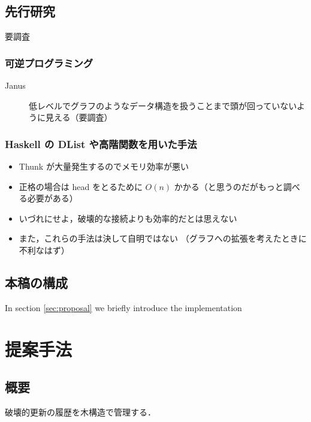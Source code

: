 \documentclass[10pt, a4j, twocolumn]{scrartcl}
\begin{document}
\subsection{先行研究}
\label{sec:org99d6785}

要調査

\subsubsection{可逆プログラミング}
\label{sec:orge2616bb}
\begin{description}
\item[{Janus}] 低レベルでグラフのようなデータ構造を扱うことまで頭が回っていないように見える（要調査）
\end{description}


\subsubsection{Haskell の DList や高階関数を用いた手法}
\label{sec:org884b901}
\begin{itemize}
\item Thunk が大量発生するのでメモリ効率が悪い
\item 正格の場合は head をとるために \(O(n)\) かかる（と思うのだがもっと調べる必要がある）
\item いづれにせよ，破壊的な接続よりも効率的だとは思えない
\item また，これらの手法は決して自明ではない
（グラフへの拡張を考えたときに不利なはず）
\end{itemize}


\subsection{本稿の構成}
\label{sec:org78ad6c8}

In section \ref{sec:proposal} we briefly introduce the implementation


\section{提案手法}
\label{sec:org773aa7b}

\label{sec:proposal}

\subsection{概要}
\label{sec:orgc9bffcc}

破壊的更新の履歴を木構造で管理する．
\end{document}
